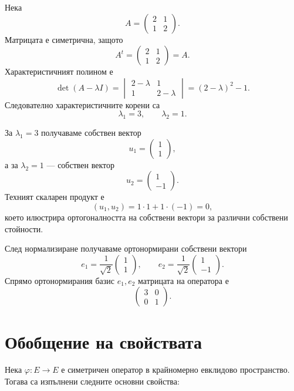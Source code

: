 \begin{example}
Нека
\[
A=
\begin{pmatrix}
2 & 1\\
1 & 2
\end{pmatrix}.
\]
Матрицата е симетрична, защото
\[
A^t=
\begin{pmatrix}
2 & 1\\
1 & 2
\end{pmatrix}
=A.
\]
Характеристичният полином е
\[
\det(A-\lambda I)
=
\begin{vmatrix}
2-\lambda & 1\\
1 & 2-\lambda
\end{vmatrix}
=
(2-\lambda)^2-1.
\]
Следователно характеристичните корени са
\[
\lambda_1=3,\qquad \lambda_2=1.
\]

За $\lambda_1=3$ получаваме собствен вектор
\[
u_1=
\begin{pmatrix}
1\\
1
\end{pmatrix},
\]
а за $\lambda_2=1$ --- собствен вектор
\[
u_2=
\begin{pmatrix}
1\\
-1
\end{pmatrix}.
\]
Техният скаларен продукт е
\[
(u_1,u_2)=1\cdot1+1\cdot(-1)=0,
\]
което илюстрира ортогоналността на собствени вектори за различни собствени стойности.

След нормализиране получаваме ортонормирани собствени вектори
\[
e_1=\frac{1}{\sqrt{2}}
\begin{pmatrix}
1\\
1
\end{pmatrix},
\qquad
e_2=\frac{1}{\sqrt{2}}
\begin{pmatrix}
1\\
-1
\end{pmatrix}.
\]
Спрямо ортонормирания базис $e_1,e_2$ матрицата на оператора е
\[
\begin{pmatrix}
3 & 0\\
0 & 1
\end{pmatrix}.
\]
\end{example}

\section{Обобщение на свойствата}\label{s:30.6}

Нека $\varphi:E\to E$ е симетричен оператор в крайномерно евклидово пространство. Тогава са изпълнени следните основни свойства:

